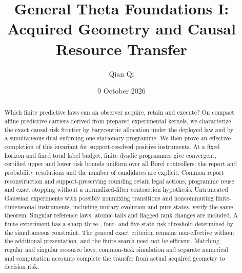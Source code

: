 \documentclass[11pt]{amsart}
\title{General Theta Foundations I:\\Acquired Geometry and Causal Resource Transfer}
\author{Qian Qi}\date{9 October 2026}
\theoremstyle{definition}\newtheorem{definition}[theorem]{Definition}
\theoremstyle{remark}\newtheorem{remark}[theorem]{Remark}
\begin{document}
\begin{abstract}
Which finite predictive laws can an observer acquire, retain and execute? On compact affine predictive carriers derived from prepared experimental kernels, we characterize the exact causal risk frontier by barycentric allocation under the deployed law and by a simultaneous dual enforcing one stationary programme. We then prove an effective completion of this invariant for support-resolved positive instruments. At a fixed horizon and fixed total label budget, finite dyadic programmes give convergent, certified upper and lower risk bounds uniform over all Borel controllers; the report and probability resolutions and the number of candidates are explicit. Common report reconstruction and support-preserving rounding retain legal actions, programme reuse and exact stopping without a normalized-filter contraction hypothesis. Untruncated Gaussian experiments with possibly nonmixing transitions and noncommuting finite-dimensional instruments, including unitary evolution and pure states, verify the same theorem. Singular reference laws, atomic tails and flagged rank changes are included. A finite experiment has a sharp three-, four- and five-state risk threshold determined by the simultaneous constraint. The general exact criterion remains non-effective without the additional presentation, and the finite search need not be efficient. Matching regular and singular resource laws, common-task simulation and separate numerical and computation accounts complete the transfer from actual acquired geometry to decision risk.
\end{abstract}
\maketitle












\appendix


\end{document}
